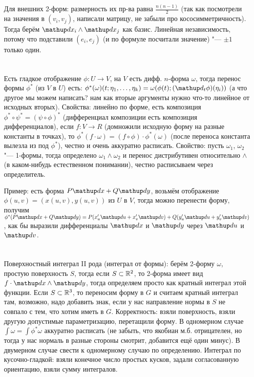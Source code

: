 Для внешних 2-форм: размерность их пр-ва равна $\frac{n(n-1)}{2}$ (так как посмотрели на значения в $(v_i, v_j)$, написали матрицу, не забыли про кососимметричность).
Тогда берём $\d x_i \wedge \d x_j$ как базис.
Линейная независимость, потому что подставили $(e_i, e_j)$ (и по формуле посчитали значение) "--- $\pm 1$ только один.

\section{} %
Есть гладкое отображение $\phi \colon U \to V$, на $V$ есть дифф. $n$-форма $\omega$, тогда перенос формы $\phi^*$ (из $V$ в $U$) есть:
$\phi^*(\omega)(t;\eta_1, \dots, \eta_k)=\omega(\phi(t);(\d_t\phi)(\eta_i))$ (а что другое мы можем написать? нам как вторые аргументы нужно что-то линейное от исходных вторых).
Свойства: линейно по форме, есть композиция $\phi^* \circ \psi^* = (\psi \circ \phi)^*$ (дифференциал композиции есть композиция дифференциалов),
если $f \colon V \to R$ (домножили исходную форму на разные константы в точках), то $\phi^*(f \cdot \omega) = (f \circ \phi) \cdot \phi^*(\omega)$
(после переноса константа вылезла из под $\phi^*$), честно и очень аккуратно расписать.
Свойство: пусть $\omega_1$, $\omega_2$ "--- 1-формы, тогда определено $\omega_1 \wedge \omega_2$ и перенос дистрибутивен относительно $\wedge$ (в каком-нибудь
естественном понимании), честно расписываем через определитель.

Пример: есть форма $P\d x + Q\d y$, возьмём отображение $\phi(u, v) = (x(u, v), y(u, v))$ из $U$ в $V$, тогда можно перенести форму,
получим $\phi^*(P\d x + Q\d y) = P(x_u' \d u + x_v' \d v) + Q(y_u' \d u + y_v' \d v)$, как бы выразили дифференциалы $\d x$ и $\d y$
через $\d u$ и $\d v$.

\section{} %
Поверхностный интеграл II рода (интеграл от формы): берём 2-форму $\omega$, простую поверхность $S$, тогда если
$S \subset \mathbb{R}^2$, то 2-форма имеет вид $f\cdot \d x \wedge \d y$, тогда определяем просто как кратный интеграл этой функции.
Если $S \subset \mathbb{R}^3$, то переносим форму в $G$ и считаем кратный интеграл там, возможно, надо добавить знак, если у нас
направление нормы в $S$ не совпало с тем, что хотим иметь в $G$.
Корректность: взяли поверхность, взяли другую допустимые параметризацию, перетащили форму.
В одномерном случае $\int \omega = \int \phi^* \omega$ аккуратно расписать (не забыть, что якобиан м.б. отрицателен, но тогда у нас нормаль в разные стороны смотрит,
добавится ещё один минус).
В двумерном случае свести к одномерному случаю по определению.
Интеграл по кусочно-гладкой: взяли конечное число простых кусков, задали согласованную ориентацию, взяли сумму интегралов.

